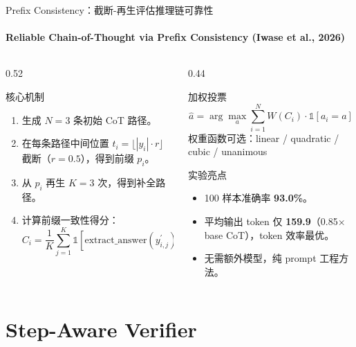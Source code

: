 \documentclass[10pt,aspectratio=169]{beamer}
\newcommand{\tightitems}{\setlength{\itemsep}{0.24em}}
\begin{document}
\begin{frame}{Prefix Consistency：截断-再生评估推理链可靠性}
  \framesubtitle{Reliable Chain-of-Thought via Prefix Consistency (Iwase et al., 2026)}
  \small
  \begin{columns}[T,onlytextwidth]
    \begin{column}{0.52\textwidth}
      \begin{block}{核心机制}
        \begin{enumerate}
          \tightitems
          \item 生成 $N=3$ 条初始 CoT 路径。
          \item 在每条路径中间位置 $t_i = \lfloor |y_i| \cdot r \rfloor$ 截断（$r=0.5$），得到前缀 $p_i$。
          \item 从 $p_i$ 再生 $K=3$ 次，得到补全路径。
          \item 计算前缀一致性得分：
          \[
            C_i = \frac{1}{K} \sum_{j=1}^{K} \mathbb{1}[\text{extract\_answer}(y_{i,j}^{\prime}) = a_i]
          \]
        \end{enumerate}
      \end{block}
    \end{column}
    \begin{column}{0.44\textwidth}
      \begin{block}{加权投票}
        \[
          \hat{a} = \arg\max_{a} \sum_{i=1}^{N} W(C_i) \cdot \mathbb{1}[a_i = a]
        \]
        \vspace{-0.3em}
        权重函数可选：linear / quadratic / cubic / unanimous
      \end{block}
      \begin{alertblock}{实验亮点}
        \begin{itemize}
          \tightitems
          \item 100 样本准确率 \textbf{93.0\%}。
          \item 平均输出 token 仅 \textbf{159.9}（0.85× base CoT），token 效率最优。
          \item 无需额外模型，纯 prompt 工程方法。
        \end{itemize}
      \end{alertblock}
    \end{column}
  \end{columns}
\end{frame}

\section{Step-Aware Verifier}
\end{document}
